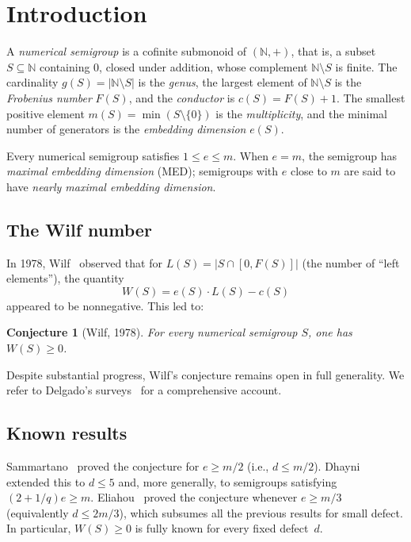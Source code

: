 \documentclass[11pt]{amsart}
\newtheorem{conjecture}[theorem]{Conjecture}
\theoremstyle{definition}
\theoremstyle{remark}
\newcommand{\NN}{\mathbb{N}}
\begin{document}
\section{Introduction}\label{sec:intro}

A \emph{numerical semigroup} is a cofinite submonoid of $(\NN, +)$,
that is, a subset $S \subseteq \NN$ containing $0$, closed under addition,
whose complement $\NN \setminus S$ is finite.
The cardinality $g(S) = |\NN \setminus S|$ is the \emph{genus},
the largest element of $\NN \setminus S$ is the \emph{Frobenius number} $F(S)$,
and the \emph{conductor} is $c(S) = F(S) + 1$.
The smallest positive element $m(S) = \min(S \setminus \{0\})$ is the \emph{multiplicity},
and the minimal number of generators is the \emph{embedding dimension} $e(S)$.

Every numerical semigroup satisfies $1 \le e \le m$.
When $e = m$, the semigroup has \emph{maximal embedding dimension} (MED);
semigroups with $e$ close to $m$ are said to have \emph{nearly maximal embedding dimension}.

\subsection{The Wilf number}
In 1978, Wilf~\cite{Wilf1978} observed that for
$L(S) = |S \cap [0, F(S)]|$ (the number of ``left elements''), the quantity
\begin{equation}\label{eq:wilf-number}
  W(S) = e(S) \cdot L(S) - c(S)
\end{equation}
appeared to be nonneg\-ative.  This led to:

\begin{conjecture}[Wilf, 1978]\label{conj:wilf}
For every numerical semigroup $S$, one has $W(S) \ge 0$.
\end{conjecture}

Despite substantial progress,
Wilf's conjecture remains open in full generality.
We refer to Delgado's surveys~\cite{Delgado2019, Delgado2020}
for a comprehensive account.

\subsection{Known results}

Sammartano~\cite{Sammartano2012} proved the conjecture for $e \ge m/2$
(i.e., $d \le m/2$).
Dhayni~\cite{Dhayni2017, Dhayni2018} extended this to $d \le 5$
and, more generally, to semigroups satisfying $(2 + 1/q)e \ge m$.
Eliahou~\cite{Eliahou2018} proved the conjecture whenever $e \ge m/3$
(equivalently $d \le 2m/3$), which subsumes all the previous results
for small defect.
In particular, $W(S) \ge 0$ is fully known for every fixed defect~$d$.
\end{document}
